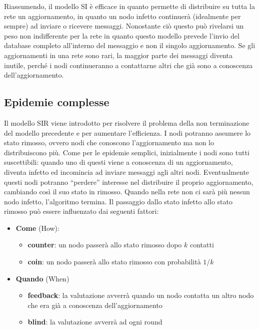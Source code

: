 Riassumendo, il modello SI è efficace in quanto permette di distribuire su tutta la rete un aggiornamento, in quanto un nodo infetto continuerà (idealmente per sempre) ad inviare o ricevere messaggi. Nonostante ciò questo può rivelarsi un peso non indifferente per la rete in quanto questo modello prevede l’invio del database completo all’interno del messaggio e non il singolo aggiornamento. Se gli aggiornamenti in una rete sono rari, la maggior parte dei messaggi diventa inutile, perché i nodi continueranno a contattarne altri che già sono a conoscenza  dell’aggiornamento. 
\subsection{Epidemie complesse}

Il modello SIR viene introdotto per risolvere il problema della non terminazione del modello precedente e per aumentare l’efficienza. I nodi potranno assumere lo stato rimosso, ovvero nodi che conoscono l’aggiornamento ma non lo distribuiscono più.
Come per le epidemie semplici, inizialmente i nodi sono tutti suscettibili: quando uno di questi viene a conoscenza di un aggiornamento, diventa infetto ed incomincia ad inviare messaggi agli altri nodi. Eventualmente questi nodi potranno “perdere” interesse nel distribuire il proprio aggiornamento, cambiando così il suo stato in rimosso.
Quando nella rete non ci sarà più nessun nodo infetto, l’algoritmo termina.
Il passaggio dallo stato infetto allo stato rimosso può essere influenzato dai seguenti fattori:

\begin{itemize}
    \item \textbf{Come} (How):
    \begin{itemize}
        \item \textbf{counter}: un nodo passerà allo stato rimosso dopo $k$ contatti
        \item \textbf{coin}: un nodo passerà allo stato rimosso con probabilità $1/k$

    \end{itemize}
    \item \textbf{Quando} (When)
    \begin{itemize}
        \item \textbf{feedback}: la valutazione avverrà quando un nodo contatta un altro nodo che era già a conoscenza dell’aggiornamento
        \item \textbf{blind}: la valutazione avverrà ad ogni round
    \end{itemize}
\end{itemize}


